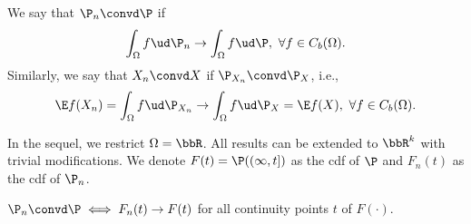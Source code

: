 \documentclass[../aipt.tex]{subfiles}
\begin{document}
%
\begin{Definition}\label{wk9:def:weak convergence}
We say that $\P_n \convd \P$ if 
\begin{align*}
\int_{\Omega} f \ud\P_n \to \int_{\Omega} f \ud\P,\ \forall f \in C_b(\Omega).
\end{align*}
Similarly, we say that $X_n \convd X$ if $\P_{X_n} \convd \P_X$, i.e., 
\begin{align*}
\E f(X_n) = \int_{\Omega} f \ud\P_{X_n} 
\to 
\int_{\Omega} f \ud\P_X = \E f(X), \ \forall f \in C_b(\Omega).
\end{align*}
\end{Definition}

In the sequel, we restrict $\Omega = \bbR$. All results can be extended to $\bbR^k$ with trivial modifications. We denote $F(t) = \P({\left(\infty, t\right]})$ as the cdf of $\P$ and $F_n(t)$ as the cdf of $\P_n$.
%
\begin{Theorem} \label{wk9:thm:convd_iff_conv_in_cdf}
$\P_n \convd \P \iff F_n(t) \to F(t)$ for all continuity points $t$ of $F(\cdot)$.
\end{Theorem}
%
\end{document}
